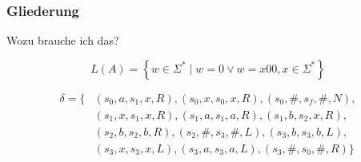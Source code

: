 \begin{frame}
	\frametitle{Gliederung}
	\tableofcontents
\end{frame}

\begin{frame}{Wozu brauche ich das?}
	
	$$L(A)=\left\{w \in \Sigma^* \mid w=0 \lor w=x00, x\in \Sigma^*\right\}$$
	
	\begin{align*}
		\delta = \{&(s_0, a, s_1, x, R), (s_0, x, s_0, x, R), (s_0, \#, s_f, \#, N),\\
		&(s_1, x, s_1, x, R), (s_1, a, s_1, a, R), (s_1, b, s_2, x, R),\\
		&(s_2, b, s_2, b, R), (s_2, \#, s_3, \#, L), (s_3, b, s_3, b, L),\\
		&(s_3, x, s_3, x, L), (s_3, a, s_3, a, L), (s_3, \#, s_0, \#, R)\}
	\end{align*}
\end{frame}